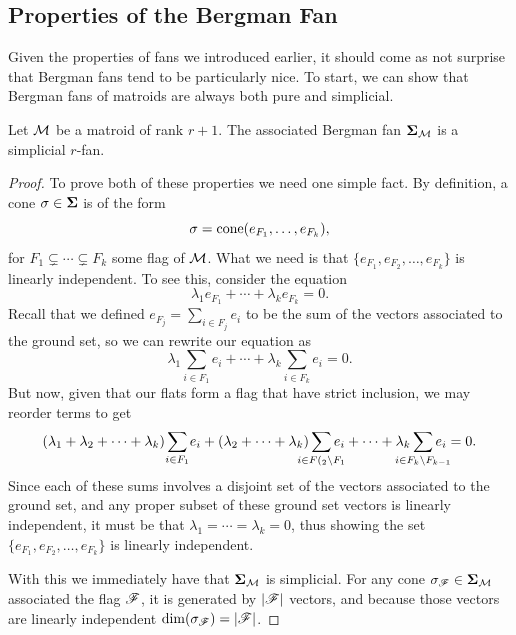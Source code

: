 \documentclass[12pt,oneside]{../../sfsuthesis}
\begin{document}
\subsection{Properties of the Bergman Fan}
Given the properties of fans we introduced earlier, it should come as not surprise that Bergman fans tend to be particularly nice.
To start, we can show that Bergman fans of matroids are always both pure and simplicial.
\begin{proposition}\th\label{thm:bergFanSimPure}
    Let \( \mathcal{M} \) be a matroid of rank \( r + 1 \).
    The associated Bergman fan \( \bm{\Sigma}_{\mathcal{M}} \) is a simplicial \( r \)-fan.
\end{proposition}
\begin{proof}
    To prove both of these properties we need one simple fact.
    By definition, a cone \( \sigma \in \bm{\Sigma} \) is of the form
    \[
        \sigma = \mathrm{cone}( e_{F_1}, \dots, e_{F_k} ),
    \]
    for \( F_1 \subsetneq \cdots \subsetneq F_k \) some flag of \( \mathcal{M} \).
    What we need is that \( \{e_{F_1}, e_{F_2}, \dots, e_{F_k} \} \) is linearly independent.
    To see this, consider the equation
    \[
        \lambda_{1}e_{F_1} + \cdots + \lambda_{k}e_{F_{k}} = 0.
    \]
    Recall that we defined \( e_{F_j} = \sum_{i \in F_{j} } e_i \) to be the sum of the vectors associated to the ground set, so we can rewrite our equation as
    \[
        \lambda_{1}\sum_{i \in F_{1} } e_i + \cdots + \lambda_{k}\sum_{i \in F_{k} } e_i = 0.
    \]
    But now, given that our flats form a flag that have strict inclusion, we may reorder terms to get
    \[
        (\lambda_1 + \lambda_2 + \cdots + \lambda_k) \sum_{\mathclap{i \in F_1}} e_i
        + (\lambda_2 + \cdots + \lambda_k) \sum_{\mathclap{i \in F(_2 \setminus F_1}} e_i
        + \cdots
        + \lambda_k \sum_{\mathclap{i \in F_k \setminus F_{k-1}}} e_i  = 0.
    \]
    Since each of these sums involves a disjoint set of the vectors associated to the ground set, and any proper subset of these ground set vectors is linearly independent, it must be that \( \lambda_1 = \cdots = \lambda_k = 0 \), thus showing the set \( \{e_{F_1}, e_{F_2}, \dots, e_{F_k} \} \) is linearly independent.

    With this we immediately have that \( \bm{\Sigma}_{\mathcal{M}} \) is simplicial.
    For any cone \( \sigma_{\mathscr{F}} \in \bm{\Sigma}_{\mathcal{M}} \) associated the flag \( \mathscr{F} \), it is generated by \( |\mathscr{F}| \) vectors, and because those vectors are linearly independent \( \dim(\sigma_{\mathscr{F}}) = |\mathscr{F}| \).


\end{proof}
\end{document}
